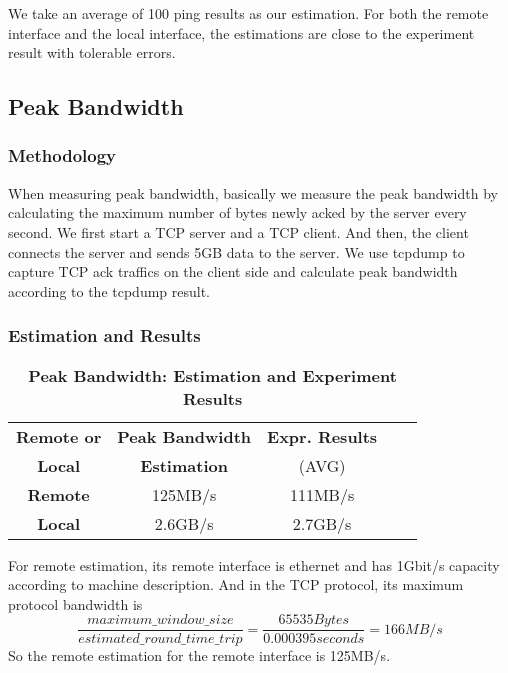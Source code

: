 We take an average of 100 ping results as our estimation. For both the remote interface and the local interface, the estimations are close to the experiment result with tolerable errors.

\subsection{Peak Bandwidth}

\subsubsection{Methodology}
When measuring peak bandwidth, basically we measure the peak bandwidth by calculating the maximum number of bytes newly acked by the server every second. We first start a TCP server and a TCP client. And then, the client connects the server and sends 5GB data to the server. We use tcpdump to capture TCP ack traffics on the client side and calculate peak bandwidth according to the tcpdump result.

\subsubsection{Estimation and Results}
\begin{table}[ht]
  \centering
  \caption{\textbf{Peak Bandwidth: Estimation and Experiment Results}}
  \begin{threeparttable}
  \begin{tabular}{ccccc}
  \hline
      \textbf{Remote or} & \textbf{Peak Bandwidth}   & \textbf{Expr. Results} \\
      \textbf{Local}   &  \textbf{Estimation}  & (AVG) \\
  \hline
      \textbf{Remote}  & 125MB/s & 111MB/s \\
      \textbf{Local} & 2.6GB/s & 2.7GB/s \\
  \hline
  \end{tabular}
  \end{threeparttable}
  \label{peak_bandwidth_table}
\end{table}

For remote estimation, its remote interface is ethernet and has 1Gbit/s capacity according to machine description. And in the TCP protocol, its maximum protocol bandwidth is $$\frac{maximum\_window\_size}{estimated\_round\_time\_trip} = \frac{65535 Bytes}{0.000395 seconds} = 166MB/s$$So the remote estimation for the remote interface is 125MB/s.

